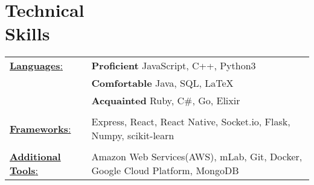 \documentclass[margin]{res}
\begin{document}
\begin{resume}
\begin{itemize}
          
          \end{itemize}
        


 

\section{Technical \\ Skills}
   \begin{tabular}{l p{4in}}
    \underline{{\bf Languages}:} & {\bf Proficient} JavaScript, C++, Python3\\
                           &  {\bf Comfortable} Java, SQL, \LaTeX\\
                           &  {\bf Acquainted} Ruby, C\#, Go, Elixir\\ \\
     \underline{{\bf Frameworks}:} &  Express, React, React Native, Socket.io,
                                      Flask, Numpy, scikit-learn\\ \\
     \underline{{\bf Additional Tools}:} & Amazon Web Services(AWS), mLab, Git, Docker, Google Cloud Platform, MongoDB\\
 \end{tabular}

\end{resume} 
\end{document}
